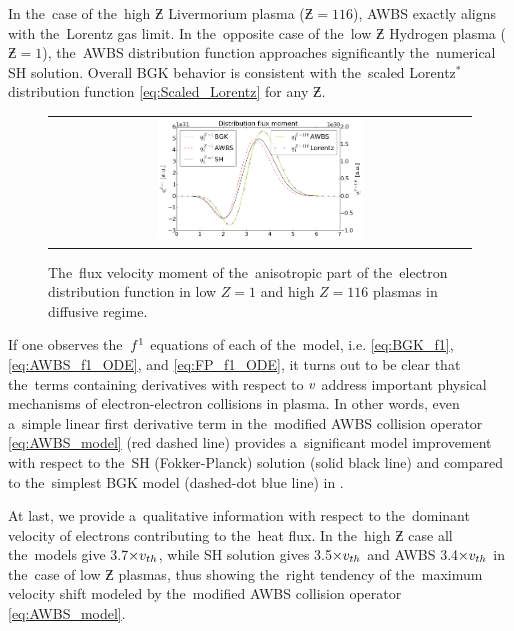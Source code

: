 In the~case of the~high $\Zbar$ Livermorium plasma ($\Zbar = 116$), 
AWBS exactly aligns with the~Lorentz gas limit. In the~opposite case of the~low
$\Zbar$ Hydrogen plasma ($\Zbar = 1$), the~AWBS distribution function 
approaches significantly the~numerical SH solution. Overall BGK behavior is 
consistent with the~scaled Lorentz$^*$ distribution function 
\eqref{eq:Scaled_Lorentz} for any $\Zbar$.  

\begin{figure}[tbh]
  \begin{center}
    \begin{tabular}{c}
      \includegraphics[width=0.5\textwidth]{q1s.png}
    \end{tabular}
  \caption{  
  The~flux velocity moment of the~anisotropic part of the~electron distribution 
  function in low $Z=1$ and high $Z=116$ plasmas in diffusive regime.}
  \label{fig:q1s_summary}
  \end{center} 
\end{figure}

If one observes the~$f^1$ equations of each of the~model, i.e.
\eqref{eq:BGK_f1}, \eqref{eq:AWBS_f1_ODE}, and \eqref{eq:FP_f1_ODE}, it turns
out to be clear that the~terms containing derivatives with respect to $v$ 
address important physical mechanisms of electron-electron collisions in plasma.
In other words, even a~simple linear first derivative term in the~modified
AWBS collision operator \eqref{eq:AWBS_model} (red dashed line) provides 
a~significant model improvement with respect to the~SH (Fokker-Planck) solution
(solid black line) and compared to the~simplest BGK model
(dashed-dot blue line) in .

At last, we provide a~qualitative information with respect to the~dominant 
velocity of electrons contributing to the~heat flux. In the~high $\Zbar$ case
all the~models give 3.7$\times v_{th}$, while SH solution gives 3.5$\times v_{th}$
and AWBS 3.4$\times v_{th}$ in the~case of low $\Zbar$ plasmas, thus showing 
the~right tendency of the~maximum velocity shift modeled by the~modified AWBS
collision operator \eqref{eq:AWBS_model}.

